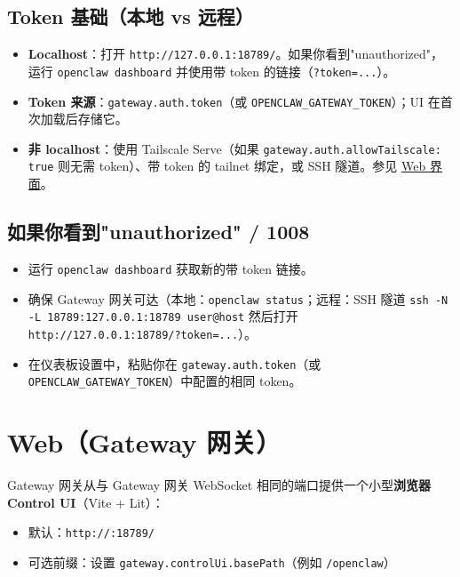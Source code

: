 \subsection{Token 基础（本地 vs 远程）}


\begin{itemize}
  \item \textbf{Localhost}：打开 \texttt{http://127.0.0.1:18789/}。如果你看到"unauthorized"，运行 \texttt{openclaw dashboard} 并使用带 token 的链接（\texttt{?token=...}）。
  \item \textbf{Token 来源}：\texttt{gateway.auth.token}（或 \texttt{OPENCLAW\_GATEWAY\_TOKEN}）；UI 在首次加载后存储它。
  \item \textbf{非 localhost}：使用 Tailscale Serve（如果 \texttt{gateway.auth.allowTailscale: true} 则无需 token）、带 token 的 tailnet 绑定，或 SSH 隧道。参见 \href{/web}{Web 界面}。
\end{itemize}


\subsection{如果你看到"unauthorized" / 1008}


\begin{itemize}
  \item 运行 \texttt{openclaw dashboard} 获取新的带 token 链接。
  \item 确保 Gateway 网关可达（本地：\texttt{openclaw status}；远程：SSH 隧道 \texttt{ssh -N -L 18789:127.0.0.1:18789 user@host} 然后打开 \texttt{http://127.0.0.1:18789/?token=...}）。
  \item 在仪表板设置中，粘贴你在 \texttt{gateway.auth.token}（或 \texttt{OPENCLAW\_GATEWAY\_TOKEN}）中配置的相同 token。
\end{itemize}



\clearpage

\section{Web（Gateway 网关）}


Gateway 网关从与 Gateway 网关 WebSocket 相同的端口提供一个小型\textbf{浏览器 Control UI}（Vite + Lit）：

\begin{itemize}
  \item 默认：\texttt{http://:18789/}
  \item 可选前缀：设置 \texttt{gateway.controlUi.basePath}（例如 \texttt{/openclaw}）
\end{itemize}


